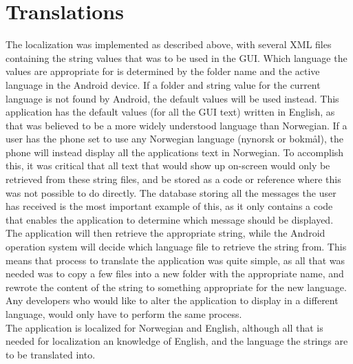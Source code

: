 
\section{Translations}

The localization was implemented as described above, with several XML files containing the string values that was to be used in the GUI.  Which language the values are appropriate for is determined by the folder name and the active language in the Android device. If a folder and string value for the current language is not found by Android, the default values will be used instead. This application has the default values (for all the GUI text) written in English, as that was believed to be a more widely understood language than Norwegian. If a user has the phone set to use any Norwegian language (nynorsk or bokmål), the phone will instead display all the applications text in Norwegian. To accomplish this, it was critical that all text that would show up on-screen would only be retrieved from these string files, and be stored as a code or reference where this was not possible to do directly. The database storing all the messages the user has received is the most important example of this, as it only contains a code that enables the application to determine which message should be displayed. The application will then retrieve the appropriate string, while the Android operation system will decide which language file to retrieve the string from. This means that process to translate the application was quite simple, as all that was needed was to copy a few files into a new folder with the appropriate name, and rewrote the content of the string to something appropriate for the new language. Any developers who would like to alter the application to display in a different language, would only have to perform the same process. \\
The application is localized for Norwegian and English, although all that is needed for localization an knowledge of English, and the language the strings are to be translated into. 